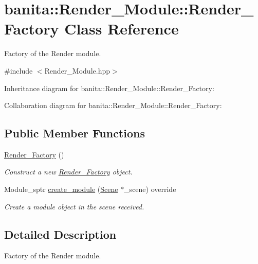 \hypertarget{classbanita_1_1_render___module_1_1_render___factory}{}\section{banita\+::Render\+\_\+\+Module\+::Render\+\_\+\+Factory Class Reference}
\label{classbanita_1_1_render___module_1_1_render___factory}


Factory of the Render module.  




{\ttfamily \#include $<$Render\+\_\+\+Module.\+hpp$>$}



Inheritance diagram for banita\+::Render\+\_\+\+Module\+::Render\+\_\+\+Factory\+:


Collaboration diagram for banita\+::Render\+\_\+\+Module\+::Render\+\_\+\+Factory\+:
\subsection*{Public Member Functions}
\begin{DoxyCompactItemize}
\item 
\mbox{\hyperlink{classbanita_1_1_render___module_1_1_render___factory_a99e14c7f5af7d784bc5ccb7a27440780}{Render\+\_\+\+Factory}} ()
\begin{DoxyCompactList}\small\item\em Construct a new \mbox{\hyperlink{classbanita_1_1_render___module_1_1_render___factory}{Render\+\_\+\+Factory}} object. \end{DoxyCompactList}\item 
Module\+\_\+sptr \mbox{\hyperlink{classbanita_1_1_render___module_1_1_render___factory_a13c65e4a433b3107602d91d9585bb381}{create\+\_\+module}} (\mbox{\hyperlink{classbanita_1_1_scene}{Scene}} $\ast$\+\_\+scene) override
\begin{DoxyCompactList}\small\item\em Create a module object in the scene received. \end{DoxyCompactList}\end{DoxyCompactItemize}


\subsection{Detailed Description}
Factory of the Render module. 



